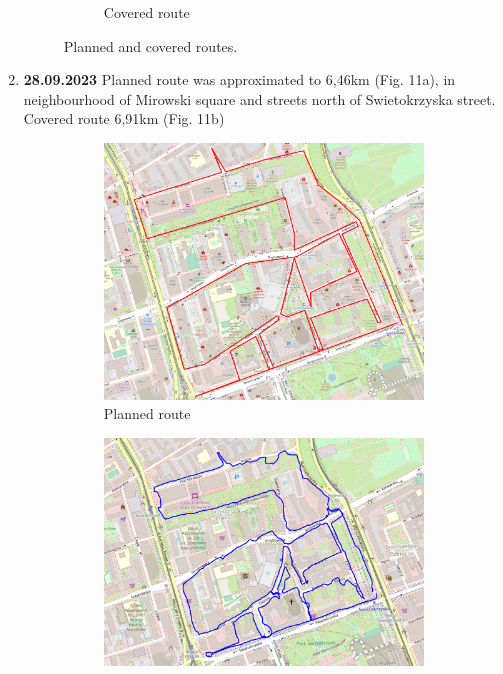 \documentclass[a4paper,12pt]{article}
\begin{document}
\begin{enumerate}
\begin{figure}[H]
\begin{subfigure}{.93\textwidth}
			\caption{Covered route}
			\label{fig:b9}
		\end{subfigure}
		\caption{Planned and covered routes.}
		\label{fig:fig9}
	\end{figure} 
	\item \textbf{28.09.2023} Planned route was approximated to 6,46km (Fig. 11a), in neighbourhood of Mirowski square and streets north of Swietokrzyska street. Covered route 6,91km (Fig. 11b)
	\begin{figure}[H]
		\centering
		\begin{subfigure}{.90\textwidth}
			\centering
			\includegraphics[width=1\linewidth]{route_p10}
			\caption{Planned route}
			\label{fig:a10}
		\end{subfigure}%
		\linebreak
		\begin{subfigure}{.90\textwidth}
			\centering
			\includegraphics[width=1\linewidth]{route_c10}

\end{subfigure}
\end{figure}
\end{enumerate}
\end{document}
